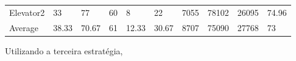 ﻿\documentclass[a4paper]{article}
\begin{document}
\begin{table}[h]
\begin{tabular}{@{}llllllllll@{}}
Elevator2 & 33       & 77            & 60           & 8                                                               & 22                                                                  & 7055                                                         & 78102                                                 & 26095                                                   & 74.96         \\
Average   & 38.33     & 70.67         & 61        & 12.33                                                            & 30.67                                                               & 8707                                                         & 75090                                                 & 27768                                                   &  73         \\ \bottomrule
\end{tabular}
\end{table}

Utilizando a terceira estratégia,
\end{document}
